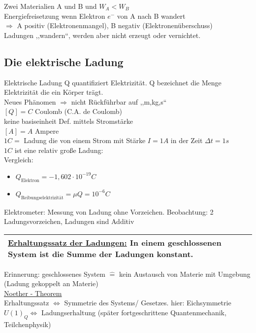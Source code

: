 \documentclass[titlepage,12pt,a4paper,ngerman]{report}
\newcommand{\tx}[1]{\textrm{#1}}
\begin{document}
Zwei Materialien A und B und $W_{A} < W_{B}$\\
Energiefreisetzung wenn Elektron $e^-$ von A nach B wandert\\
$\Rightarrow$ A positiv (Elektronenmangel), B negativ (Elektronenüberschuss)\\
Ladungen ,,wandern``, werden aber nicht erzeugt oder vernichtet.

\subsection{Die elektrische Ladung}
Elektrische Ladung Q quantifiziert Elektrizität. Q bezeichnet die Menge Elektrizität die ein Körper trägt.\\
Neues Phänomen $\Rightarrow$ nicht Rückführbar auf ,,m,kg,s``\\
$[Q] = C$ Coulomb (C.A. de Coulomb)\\
keine basiseinheit Def. mittels Stromstärke\\
$[A] = A$ Ampere\\
$1C = $ Ladung die von einem Strom mit Stärke $I = 1A$ in der Zeit $\Delta t = 1 s$\\
$1C$ ist eine relativ große Ladung:\\
Vergleich: \begin{itemize}
\item $Q_{\tx{Elektron}} = -1,602 \cdot 10^{-19} C$
\item $Q_{\tx{Reibungselektrizität}} = \mu Q = 10^{-6} C$ 
\end{itemize}


Elektrometer: Messung von Ladung ohne Vorzeichen. Beobachtung: 2 Ladungsvorzeichen, Ladungen sind Additiv

\begin{flushleft}
\begin{tabular}{|p{8cm}|}
\hline
\underline{Erhaltungssatz der Ladungen:} In einem geschlossenen System ist die Summe der Ladungen konstant.\\
\hline
\end{tabular}
\end{flushleft}

Erinnerung: geschlossenes System $\widehat{=}$ kein Austausch von Materie mit Umgebung (Ladung gekoppelt an Materie)\\[20pt]
{\large \underline{Noether - Theorem}}\\
Erhaltungssatz $\Leftrightarrow$ Symmetrie des Systems/ Gesetzes.
hier: Eichsymmetrie $U(1)_{Q}\Leftrightarrow$ Ladungserhaltung
(später fortgeschrittene Quantenmechanik, Teilchenphysik)
\end{document}
